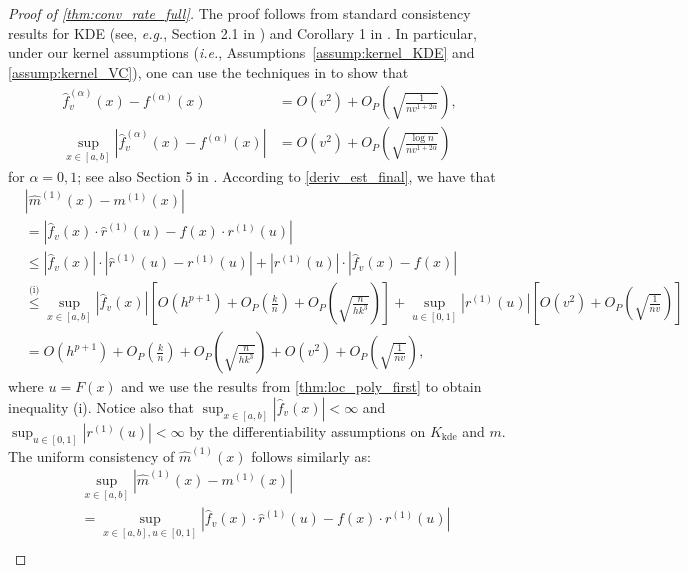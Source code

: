 \documentclass{uwstat572}
\theoremstyle{definition}
\renewcommand{\hat}{\widehat}
\theoremstyle{theorem}
\begin{document}
\begin{proof}[Proof of \autoref{thm:conv_rate_full}]
The proof follows from standard consistency results for KDE (see, \emph{e.g.}, Section 2.1 in \citealt{chen2017tutorial}) and Corollary 1 in \cite{francisco2003uniform}. In particular, under our kernel assumptions (\emph{i.e.}, Assumptions~\ref{assump:kernel_KDE} and \ref{assump:kernel_VC}), one can use the techniques in \cite{gine2002rates,Einmahl2005uniform,chacon2011asymptotics} to show that 
\begin{align*}
\hat{f}_v^{(\alpha)}(x) - f^{(\alpha)}(x) &= O(v^2) + O_P\left(\sqrt{\frac{1}{nv^{1+2\alpha}}}\right),\\ 
\sup_{x\in [a,b]}\left|\hat{f}_v^{(\alpha)}(x) - f^{(\alpha)}(x) \right| &=O(v^2) + O_P\left(\sqrt{\frac{\log n}{nv^{1+2\alpha}}}\right)
\end{align*}
for $\alpha=0,1$; see also Section 5 in \cite{genovese2014nonparametric}. According to \eqref{deriv_est_final}, we have that
\begin{align*}
&\left|\hat{m}^{(1)}(x) - m^{(1)}(x)\right| \\
&= \left|\hat{f}_v(x) \cdot \hat{r}^{(1)}(u) - f(x)\cdot r^{(1)}(u) \right|\\
&\leq \left|\hat{f}_v(x)\right| \cdot \left|\hat{r}^{(1)}(u) -r^{(1)}(u) \right| + \left|r^{(1)}(u)\right|\cdot \left|\hat{f}_v(x) -f(x)\right|\\
& \stackrel{\text{(i)}}{\leq} \sup_{x\in [a,b]} \left|\hat{f}_v(x)\right| \left[O(h^{p+1}) + O_P\left(\frac{k}{n}\right) +O_P\left(\sqrt{\frac{n}{hk^3}}\right)\right] + \sup_{u\in [0,1]}\left|r^{(1)}(u)\right| \left[O(v^2) + O_P\left(\sqrt{\frac{1}{nv}}\right)\right]\\
&= O(h^{p+1}) + O_P\left(\frac{k}{n}\right) +O_P\left(\sqrt{\frac{n}{hk^3}}\right) + O(v^2) + O_P\left(\sqrt{\frac{1}{nv}}\right),
\end{align*}
where $u=F(x)$ and we use the results from \autoref{thm:loc_poly_first} to obtain inequality (i). Notice also that $\sup_{x\in [a,b]} \left|\hat{f}_v(x)\right| <\infty$ and $\sup_{u\in [0,1]}\left|r^{(1)}(u)\right|<\infty$ by the differentiability assumptions on $K_{\text{kde}}$ and $m$. The uniform consistency of $\hat{m}^{(1)}(x)$ follows similarly as:
\begin{align*}
&\sup_{x\in [a,b]} \left|\hat{m}^{(1)}(x) - m^{(1)}(x)\right| \\
&= \sup_{x\in [a,b], u\in [0,1]}\left|\hat{f}_v(x) \cdot \hat{r}^{(1)}(u) - f(x)\cdot r^{(1)}(u) \right|\\

\end{align*}
\end{proof}
\end{document}
